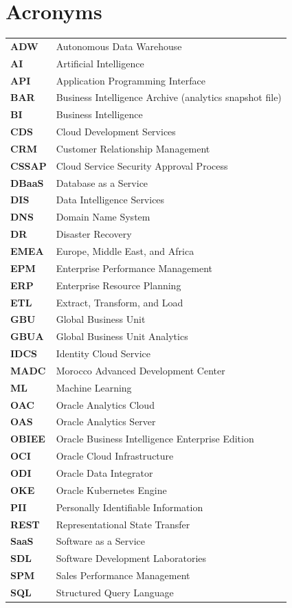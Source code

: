 \chapter{Acronyms}

\begin{longtable}{@{}p{2.8cm}p{11cm}@{}}
\textbf{ADW} & Autonomous Data Warehouse \\
\textbf{AI} & Artificial Intelligence \\
\textbf{API} & Application Programming Interface \\
\textbf{BAR} & Business Intelligence Archive (analytics snapshot file) \\
\textbf{BI} & Business Intelligence \\
\textbf{CDS} & Cloud Development Services \\
\textbf{CRM} & Customer Relationship Management \\
\textbf{CSSAP} & Cloud Service Security Approval Process \\
\textbf{DBaaS} & Database as a Service \\
\textbf{DIS} & Data Intelligence Services \\
\textbf{DNS} & Domain Name System \\
\textbf{DR} & Disaster Recovery \\
\textbf{EMEA} & Europe, Middle East, and Africa \\
\textbf{EPM} & Enterprise Performance Management \\
\textbf{ERP} & Enterprise Resource Planning \\
\textbf{ETL} & Extract, Transform, and Load \\
\textbf{GBU} & Global Business Unit \\
\textbf{GBUA} & Global Business Unit Analytics \\
\textbf{IDCS} & Identity Cloud Service \\
\textbf{MADC} & Morocco Advanced Development Center \\
\textbf{ML} & Machine Learning \\
\textbf{OAC} & Oracle Analytics Cloud \\
\textbf{OAS} & Oracle Analytics Server \\
\textbf{OBIEE} & Oracle Business Intelligence Enterprise Edition \\
\textbf{OCI} & Oracle Cloud Infrastructure \\
\textbf{ODI} & Oracle Data Integrator \\
\textbf{OKE} & Oracle Kubernetes Engine \\
\textbf{PII} & Personally Identifiable Information \\
\textbf{REST} & Representational State Transfer \\
\textbf{SaaS} & Software as a Service \\
\textbf{SDL} & Software Development Laboratories \\
\textbf{SPM} & Sales Performance Management \\
\textbf{SQL} & Structured Query Language \\
\end{longtable}

